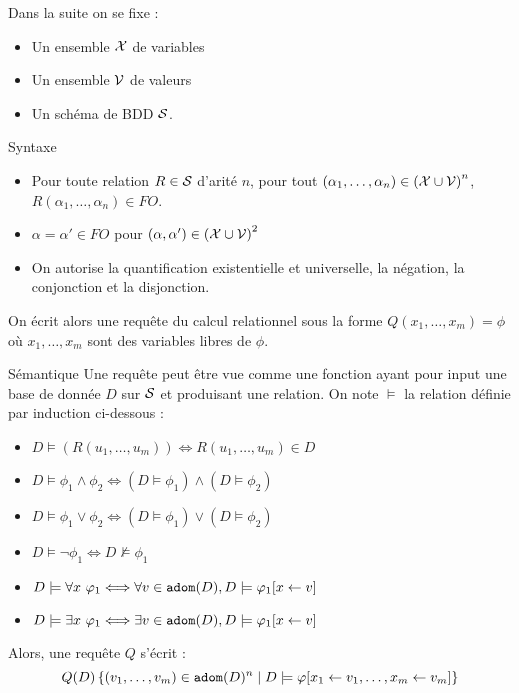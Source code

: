 \documentclass{cours}
\begin{document}
Dans la suite on se fixe : 
\begin{itemize}
    \item Un ensemble $\mX$ de variables
    \item Un ensemble $\mV$ de valeurs
    \item Un schéma de BDD $\mS$.
\end{itemize}

\begin{propositionfr}{Syntaxe}{}
    \begin{itemize}
        \item Pour toute relation $R \in \mS$ d'arité $n$, pour tout $\left(\alpha_{1}, \ldots, \alpha_{n}\right) \in \left(\mX \cup \mV\right)^{n}$, $R(\alpha_{1}, \ldots, \alpha_{n}) \in FO$.
        \item $\alpha = \alpha' \in FO$ pour $\left(\alpha, \alpha'\right)\in \left(\mX \cup \mV\right)^{2}$
        \item On autorise la quantification existentielle et universelle, la négation, la conjonction et la disjonction.
    \end{itemize}
    On écrit alors une requête du calcul relationnel sous la forme $Q(x_{1}, \ldots, x_{m}) = \phi$ où $x_{1}, \ldots, x_{m}$ sont des variables libres de $\phi$.
\end{propositionfr}

\begin{propositionfr}{Sémantique}{}
    Une requête peut être vue comme une fonction ayant pour input une base de donnée $D$ sur $\mS$ et produisant une relation. On note $\models$ la relation définie par induction ci-dessous : 
    \begin{itemize}
        \item $D \models (R(u_{1}, \ldots, u_{m})) \Longleftrightarrow R(u_{1}, \ldots, u_{m}) \in D$
        \item $D \models \phi_{1} \land \phi_{2} \Longleftrightarrow \left(D \models \phi_{1}\right) \land \left(D\models \phi_{2}\right)$
        \item $D \models \phi_{1} \lor \phi_{2} \Longleftrightarrow \left(D \models \phi_{1}\right) \lor \left(D\models \phi_{2}\right)$
        \item $D \models \lnot\phi_{1} \Longleftrightarrow D \not\models \phi_{1}$
        \item $D \models \forall x \ \phi_{1} \Longleftrightarrow \forall v \in {\tt adom}(D), D \models \phi_{1}[x \leftarrow v]$
        \item $D \models \exists x \ \phi_{1} \Longleftrightarrow \exists v \in {\tt adom}(D), D \models \phi_{1}[x \leftarrow v]$
    \end{itemize}
    Alors, une requête $Q$ s'écrit : 
    \[
        Q(D) \left\{(v_{1}, \ldots, v_{m}) \in {\tt adom}(D)^{n}\mid D \models \phi[x_{1} \leftarrow v_{1}, \ldots, x_{m} \leftarrow v_{m}]\right\}
    \]
\end{propositionfr}
\end{document}

